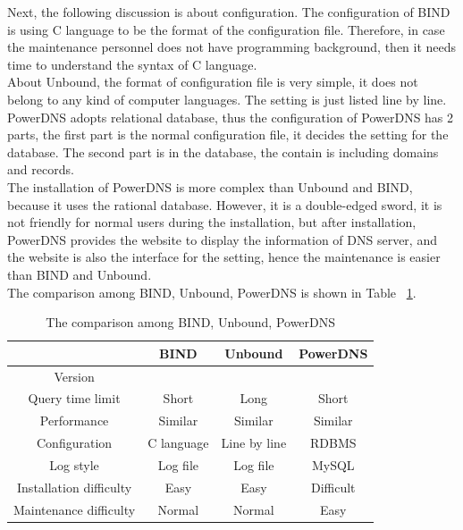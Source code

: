 Next, the following discussion is about configuration. The configuration of BIND is using C language to be the format of the configuration file. Therefore, in case the maintenance personnel does not have programming background, then it needs time to understand the syntax of C language.
\\

About Unbound, the format of configuration file is very simple, it does not belong to any kind of computer languages. The setting is just listed line by line.
\\

PowerDNS adopts relational database, thus the configuration of PowerDNS has 2 parts, the first part is the normal configuration file, it decides the setting for the database. The second part is in the database, the contain is including domains and records.
\\

The installation of PowerDNS is more complex than Unbound and BIND, because it uses the rational database. However, it is a double-edged sword, it is not friendly for normal users during the installation, but after installation, PowerDNS provides the website to display the information of DNS server, and the website is also the interface for the setting, hence the maintenance is easier than BIND and Unbound.
\\

The comparison among BIND, Unbound, PowerDNS is shown in Table ~\ref{tab:BIND_unbound_powerDNS}.

\begin{table}[hbt!]
    \centering
    \begin{tabular}{|c|c|c|c|}
        \hline
         & BIND & Unbound & PowerDNS \\    
        \hline
         Version &  &  & \\
        \hline
         Query time limit & Short & Long & Short \\
        \hline
         Performance & Similar & Similar & Similar \\
        \hline
         Configuration & C language & Line by line  & RDBMS \\
        \hline
         Log style & Log file & Log file & MySQL \\
        \hline
         Installation difficulty & Easy & Easy & Difficult \\
        \hline
         Maintenance difficulty & Normal & Normal & Easy \\
        \hline
    \end{tabular}
    \caption{The comparison among BIND, Unbound, PowerDNS}
    \label{tab:BIND_unbound_powerDNS}
\end{table}

